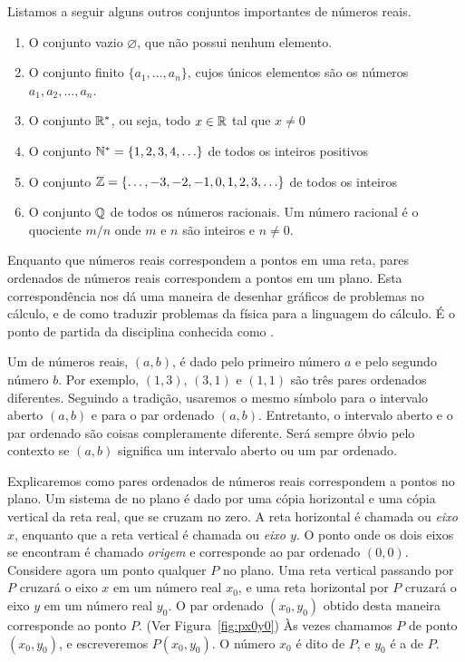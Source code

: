 \documentclass{svmono}
\begin{document}
Listamos a seguir alguns outros conjuntos importantes de números reais.

\begin{enumerate}[(1)]
\item O conjunto vazio $\varnothing$, que não possui nenhum elemento.
\item O conjunto finito $\{ a_1, \ldots, a_n \}$, cujos únicos elementos
      são os números $a_1, a_2, \ldots, a_n$.
\item O conjunto $\mathbb{R}^*$, ou seja, todo $x \in \mathbb{R}$ tal que $x \ne 0$
\item O conjunto $\mathbb{N}^* = \{ 1, 2, 3, 4, \ldots \}$ de todos os
      inteiros positivos%
\item O conjunto $\mathbb{Z} = \{ \ldots, -3, -2, -1, 0, 1, 2, 3, \ldots \}$
      de todos os inteiros
\item O conjunto $\mathbb{Q}$ de todos os números racionais. Um número
      racional é o quociente $m/n$ onde $m$ e $n$ são inteiros e $n \ne 0$.
\end{enumerate}

Enquanto que números reais correspondem a pontos em uma reta, pares
ordenados de números reais correspondem a pontos em um plano. Esta
correspondência nos dá uma maneira de desenhar gráficos de problemas
no cálculo, e de como traduzir problemas da física para a linguagem do
cálculo. É o ponto de partida da disciplina conhecida como
.

Um  de números reais, $( a,b )$, é dado
pelo primeiro número $a$ e pelo segundo número $b$. Por exemplo, $( 1,3 )$, $( 3,1 )$ e $( 1,1 )$ são três pares ordenados
diferentes. Seguindo a tradição, usaremos o mesmo símbolo para o intervalo
aberto $(a,b)$ e para o par ordenado $(a, b)$. Entretanto, o intervalo
aberto e o par ordenado são coisas compleramente diferente. Será sempre
óbvio pelo contexto se $(a,b)$ significa um intervalo aberto ou
um par ordenado.

Explicaremos como pares ordenados de números reais correspondem a
pontos no plano. Um sistema de  no
plano é dado por uma cópia horizontal e uma cópia vertical da reta
real, que se cruzam no zero. A reta horizontal é chamada  ou \emph{eixo $x$}, enquanto que a reta vertical é chamada
 ou \emph{eixo $y$}. O ponto onde os dois
eixos se encontram é chamado \emph{origem} e corresponde ao par
ordenado $(0,0)$. Considere agora um ponto qualquer $P$ no plano. Uma
reta vertical passando por $P$ cruzará o eixo $x$ em um número real
$x_0$, e uma reta horizontal por $P$ cruzará o eixo $y$ em um número
real $y_0$. O par ordenado $(x_0,y_0)$  obtido desta maneira corresponde
ao ponto $P$. (Ver Figura~\ref{fig:px0y0}) Às vezes chamamos $P$ de ponto
$(x_0,y_0)$, e escreveremos $P(x_0,y_0)$. O número $x_0$ é dito
 de $P$, e $y_0$ é a  de $P$.
\end{document}
